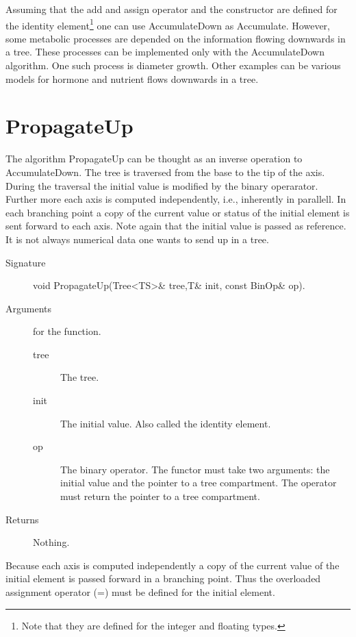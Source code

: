 Assuming  that the  add and  assign operator  and the  constructor are
defined for  the identity element\footnote{Note that  they are defined
for  the integer  and floating  types.} one  can use  AccumulateDown as
Accumulate.   However, some  metabolic processes  are depended  on the
information  flowing downwards  in  a tree.   These  processes can  be
implemented only with the  AccumulateDown algorithm.  One such process
is diameter growth.  Other examples  can be various models for hormone
and nutrient flows downwards in a tree.

\section{PropagateUp}

The algorithm PropagateUp  can be thought as  an inverse  operation to
AccumulateDown. The tree is traversed from the  base to the tip of the
axis. During the traversal the initial value is modified by the binary
operarator. Further  more each axis  is computed  independently, i.e.,
inherently in parallell. In each branching point a copy of the current
value or status of the  initial element is  sent forward to each axis.
Note again  that the initial value  is passed as  reference. It is not
always numerical data one wants to send up in a tree.

\begin{description}
   \item [Signature] void PropagateUp(Tree<TS>\& tree,T\& init, const BinOp\& op).
   \item [Arguments] for the function.
     \begin{description}
        \item [tree] The tree.
        \item [init] The initial value. Also called the identity
     element.
        \item [op] The binary operator. The functor must take two
     arguments: the initial value and the pointer to a tree compartment. The
     operator must return the pointer to a tree compartment.
     \end{description} 
   \item[Returns] Nothing.
\end{description} 
 
Because  each  axis is computed   independently a copy of  the current
value  of  the initial  element   is  passed forward   in a  branching
point. Thus the overloaded assignment operator (=) must be defined for
the initial element.

